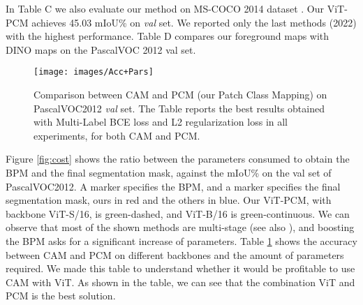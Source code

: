 \documentclass[runningheads]{styles/llncs}
\makeatletter
\newcommand\tabcaption{\def\@captype{table}\caption}
\makeatother
\begin{document}
\noindent 
In Table {\color{red}C} we also evaluate our method on MS-COCO 2014 dataset \cite{lin2014microsoft}. Our ViT-PCM achieves 45.03 mIoU\% on \textit{val} set. We reported only the last methods (2022) with the highest performance.
\noindent
Table {\color{red}D} compares our foreground maps with DINO \cite{caron2021emerging} maps on the PascalVOC 2012 val set.
\noindent
\begin{figure}
\begin{minipage}[b]{0.49\textwidth}
\centering
 \texttt{[image: images/Acc+Pars]}
\caption{Networks parameters consumed from the BPM to the final-segmentation in ours and other methods, against mIoU\% on PascalVoc2012 val. set. }
\label{fig:cost}
\end{minipage}\hfill \begin{minipage}[b]{0.49\textwidth}
\centering
{}
\tabcaption{Comparison between CAM \cite{zhou2016learning} and PCM (our Patch Class Mapping) on PascalVOC2012 \textit{val} set. The Table reports the best results obtained with Multi-Label BCE loss and L2 regularization loss in all experiments, for both CAM and PCM.}
\label{table:CAM-PCM}
\end{minipage}\end{figure}
\noindent
Figure \ref{fig:cost} shows the ratio between the parameters consumed to obtain the BPM and the final segmentation mask, against the mIoU\% on the val set of PascalVOC2012. 
A  marker specifies the BPM, and a  marker specifies the final segmentation mask, ours in red and the others in blue. Our ViT-PCM, with backbone ViT-S/16,  is green-dashed, and ViT-B/16 is green-continuous. We can observe that most of the shown methods are multi-stage (see also \cite{araslanov2020single,ru2022learning}), and boosting the BPM asks for a significant increase of parameters. 
\noindent
Table \ref{table:CAM-PCM} shows the accuracy between CAM and PCM on different backbones and the amount of parameters required. We made this table to understand whether it would be profitable to use CAM with ViT. As shown in the table, we can see that the combination ViT and PCM is the best solution.
\end{document}
